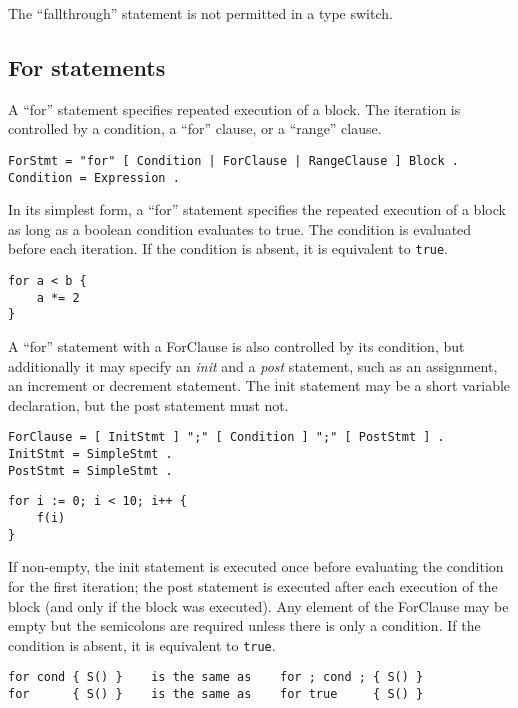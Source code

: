 The ``fallthrough'' statement is not permitted in a type switch.

\subsection*{For statements}

A ``for'' statement specifies repeated execution of a block. The
iteration is controlled by a condition, a ``for'' clause, or a ``range''
clause.

\begin{Verbatim}[frame=single]
ForStmt = "for" [ Condition | ForClause | RangeClause ] Block .
Condition = Expression .
\end{Verbatim}

In its simplest form, a ``for'' statement specifies the repeated
execution of a block as long as a boolean condition evaluates to true.
The condition is evaluated before each iteration. If the condition is
absent, it is equivalent to \texttt{true}.

\begin{Verbatim}[frame=single]
for a < b {
    a *= 2
}
\end{Verbatim}

A ``for'' statement with a ForClause is also controlled by its
condition, but additionally it may specify an \emph{init} and a
\emph{post} statement, such as an assignment, an increment or decrement
statement. The init statement may be a
short variable declaration,
but the post statement must not.

\begin{Verbatim}[frame=single]
ForClause = [ InitStmt ] ";" [ Condition ] ";" [ PostStmt ] .
InitStmt = SimpleStmt .
PostStmt = SimpleStmt .
\end{Verbatim}

\begin{Verbatim}[frame=single]
for i := 0; i < 10; i++ {
    f(i)
}
\end{Verbatim}

If non-empty, the init statement is executed once before evaluating the
condition for the first iteration; the post statement is executed after
each execution of the block (and only if the block was executed). Any
element of the ForClause may be empty but the
semicolons are required unless there is only a
condition. If the condition is absent, it is equivalent to
\texttt{true}.

\begin{Verbatim}[frame=single]
for cond { S() }    is the same as    for ; cond ; { S() }
for      { S() }    is the same as    for true     { S() }
\end{Verbatim}

